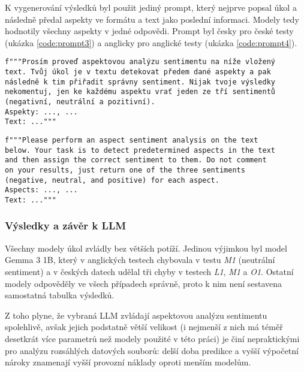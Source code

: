 K vygenerování výsledků byl použit jediný prompt, který nejprve popsal úkol a následně předal aspekty ve formátu  a text jako poslední informaci. Modely tedy hodnotily všechny aspekty v jedné odpovědi. Prompt byl česky pro české testy (ukázka \ref{code:prompt3}) a anglicky pro anglické testy (ukázka \ref{code:prompt4}).

\begin{listing}[ht]
\begin{verbatim}
f"""Prosím proveď aspektovou analýzu sentimentu na níže vložený 
text. Tvůj úkol je v textu detekovat předem dané aspekty a pak 
následně k tim přiřadit správny sentiment. Nijak tvoje výsledky 
nekomentuj, jen ke každému aspektu vrať jeden ze tří sentimentů 
(negativní, neutrální a pozitivní).
Aspekty: ..., ...
Text: ..."""
\end{verbatim}
\caption[Ukázka promptu v češtině pro analýzu sentimentu]%
{Ukázka promptu v češtině pro analýzu sentimentu u LLM, vlastní práce}
\label{code:prompt3}
\end{listing}

\begin{listing}[ht]
\begin{verbatim}
f"""Please perform an aspect sentiment analysis on the text 
below. Your task is to detect predetermined aspects in the text 
and then assign the correct sentiment to them. Do not comment 
on your results, just return one of the three sentiments 
(negative, neutral, and positive) for each aspect.
Aspects: ..., ...
Text: ..."""
\end{verbatim}
\caption[Ukázka promptu v angličtině pro analýzu sentimentu]%
{Ukázka promptu v angličtině pro analýzu sentimentu u LLM, vlastní práce}
\label{code:prompt4}
\end{listing}

\subsubsection{Výsledky a závěr k LLM}
Všechny modely úkol zvládly bez větších potíží. Jedinou výjimkou byl model Gemma 3 1B, který v anglických testech chybovala v testu \emph{M1} (neutrální sentiment) a v českých datech udělal tři chyby v testech \emph{L1}, \emph{M1} a \emph{O1}. Ostatní modely odpověděly ve všech případech správně, proto k nim není sestavena samostatná tabulka výsledků.

Z toho plyne, že vybraná LLM zvládají aspektovou analýzu sentimentu spolehlivě, avšak jejich podstatně větší velikost (i nejmenší z nich má téměř desetkrát více parametrů než modely použité v této práci) je činí nepraktickými pro analýzu rozsáhlých datových souborů: delší doba predikce a vyšší výpočetní nároky znamenají vyšší provozní náklady oproti menším modelům.


